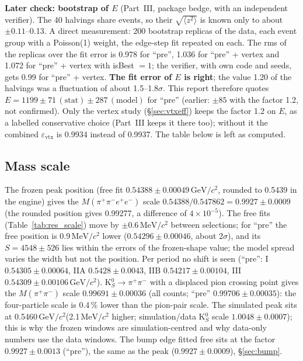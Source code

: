 \documentclass[11pt,a4paper]{article}
\newcommand{\pipi}{\ensuremath{\pi^{+}\pi^{-}}\xspace}
\newcommand{\Mfour}{\ensuremath{M(\pi^{+}\pi^{-}e^{+}e^{-})}\xspace}
\newcommand{\Mpipi}{\ensuremath{M(\pi^{+}\pi^{-})}\xspace}
\newcommand{\GeVcc}{\ensuremath{\mathrm{GeV}/c^{2}}\xspace}
\newcommand{\MeVcc}{\ensuremath{\mathrm{MeV}/c^{2}}\xspace}
\begin{document}
\textbf{Later check: bootstrap of $E$} (Part~III, package bedge, with an independent verifier). The 40 halvings share events, so their
$\sqrt{\langle z^2\rangle}$ is known only to about $\pm0.11$--0.13. A direct measurement: 200 bootstrap replicas of the data, each event
group with a Poisson(1) weight, the edge-step fit repeated on each. The rms of the replicas over the fit error is 0.978 for ``pre'', 1.036 for
``pre'' + vertex and 1.072 for ``pre'' + vertex with isBest $=1$; the verifier, with own code and seeds, gets 0.99 for ``pre'' + vertex.
\textbf{The fit error of $E$ is right}; the value 1.20 of the halvings was a fluctuation of about 1.5--1.8$\sigma$. This report therefore
quotes $E=1199\pm71\,(\mathrm{stat})\pm287\,(\mathrm{model})$ for ``pre'' (earlier: $\pm85$ with the factor 1.2, not confirmed). Only the vertex
study (\S\ref{sec:vtxeff}) keeps the factor 1.2 on $E$, as a labelled conservative choice (Part~III keeps it there too); without it the
combined $\varepsilon_{\mathrm{vtx}}$ is 0.9934 instead of 0.9937. The table below is left as computed.



\subsection{Mass scale}
\label{sec:scale}
The frozen peak position (free fit $0.54388\pm0.00049$\,\GeVcc, rounded to 0.5439 in the engine) gives the \Mfour scale
$0.54388/0.547862=0.9927\pm0.0009$ (the rounded position gives 0.99277, a difference of $4\times10^{-5}$). The free fits
(Table~\ref{tab:res_scale}) move by $\pm0.6$\,\MeVcc between selections; for ``pre'' the free position is 0.9\,\MeVcc lower
($0.54296\pm0.00046$, about $2\sigma$), and its $S=4548\pm526$ lies within the errors of the frozen-shape value; the model spread
varies the width but not the position. Per period no shift is seen (``pre'': I $0.54305\pm0.00064$, IIA $0.5428\pm0.0043$,
IIB $0.54217\pm0.00104$, III $0.54309\pm0.00106$\,\GeVcc). K$^0_S\to\pipi$ with a displaced pion crossing point gives the \Mpipi scale
$0.99691\pm0.00036$ (all counts; ``pre'' $0.99706\pm0.00035$): the four-particle scale is 0.4\,\% lower than the pion-pair scale. The
simulated peak sits at 0.5460\,\GeVcc (2.1\,\MeVcc higher; simulation/data K$^0_S$ scale $1.0048\pm0.0007$); this is why the frozen windows
are simulation-centred and why data-only numbers use the data windows. The bump edge fitted free sits at the factor $0.9927\pm0.0013$
(``pre''), the same as the peak ($0.9927\pm0.0009$), \S\ref{sec:bump}.
\end{document}
